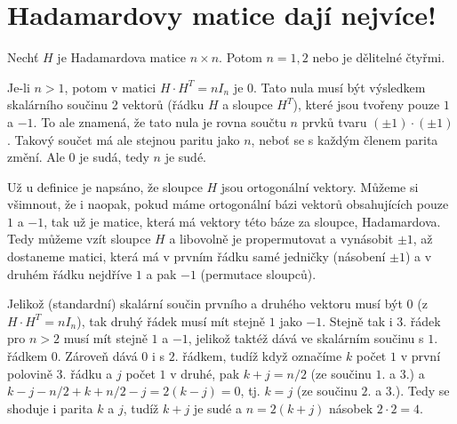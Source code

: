 \documentclass[12pt]{article}					%
\begin{document}
\section*{Hadamardovy matice dají nejvíce!}
    \begin{priklad}[10.1]
        Nechť $H$ je Hadamardova matice $n \times n$. Potom $n = 1, 2$ nebo je dělitelné čtyřmi.

        \begin{dukazin}
            Je-li $n > 1$, potom v matici $H·H^T = nI_n$ je $0$. Tato nula musí být výsledkem skalárního součinu 2 vektorů (řádku $H$ a sloupce $H^T$), které jsou tvořeny pouze $1$ a $-1$. To ale znamená, že tato nula je rovna součtu $n$ prvků tvaru $(±1)·(±1)$. Takový součet má ale stejnou paritu jako $n$, neboť se s každým členem parita změní. Ale $0$ je sudá, tedy $n$ je sudé.

            Už u definice je napsáno, že sloupce $H$ jsou ortogonální vektory. Můžeme si všimnout, že i naopak, pokud máme ortogonální bázi vektorů obsahujících pouze $1$ a $-1$, tak už je matice, která má vektory této báze za sloupce, Hadamardova. Tedy můžeme vzít sloupce $H$ a libovolně je propermutovat a vynásobit $±1$, až dostaneme matici, která má v prvním řádku samé jedničky (násobení $±1$) a v druhém řádku nejdříve $1$ a pak $-1$ (permutace sloupců).

            Jelikož (standardní) skalární součin prvního a druhého vektoru musí být $0$ (z $H·H^T = nI_n$), tak druhý řádek musí mít stejně $1$ jako $-1$. Stejně tak i $3.$ řádek pro $n > 2$ musí mít stejně $1$ a $-1$, jelikož taktéž dává ve skalárním součinu s $1.$ řádkem $0$. Zároveň dává $0$ i s $2.$ řádkem, tudíž když označíme $k$ počet $1$ v první polovině 3. řádku a $j$ počet $1$ v druhé, pak $k+j = n/2$ (ze součinu $1.$ a $3.$) a $k - j - n/2 + k + n/2 - j = 2(k-j) = 0$, tj. $k = j$ (ze součinu $2.$ a $3.$). Tedy se shoduje i parita $k$ a $j$, tudíž $k+j$ je sudé a $n = 2(k+j)$ násobek $2·2 = 4$.
        \end{dukazin}
    \end{priklad}

\pagebreak
\end{document}
